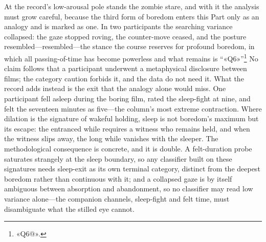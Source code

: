 At the record's low-arousal pole stands the zombie stare, and with it the analysis must grow careful, because the third form of boredom enters this Part only as an analogy and is marked as one. In two participants the searching variance collapsed: the gaze stopped roving, the counter-move ceased, and the posture resembled---resembled---the stance the course reserves for profound boredom, in which all passing-of-time has become powerless and what remains is ``«Q6»''\footnote{«Q6@».} No claim follows that a participant underwent a metaphysical disclosure between films; the category caution forbids it, and the data do not need it. What the record adds instead is the exit that the analogy alone would miss. One participant fell asleep during the boring film, rated the sleep-fight at nine, and felt the seventeen minutes as five---the column's most extreme contraction. Where dilation is the signature of wakeful holding, sleep is not boredom's maximum but its escape: the entranced while requires a witness who remains held, and when the witness slips away, the long while vanishes with the sleeper. The methodological consequence is concrete, and it is double. A felt-duration probe saturates strangely at the sleep boundary, so any classifier built on these signatures needs sleep-exit as its own terminal category, distinct from the deepest boredom rather than continuous with it; and a collapsed gaze is by itself ambiguous between absorption and abandonment, so no classifier may read low variance alone---the companion channels, sleep-fight and felt time, must disambiguate what the stilled eye cannot.

